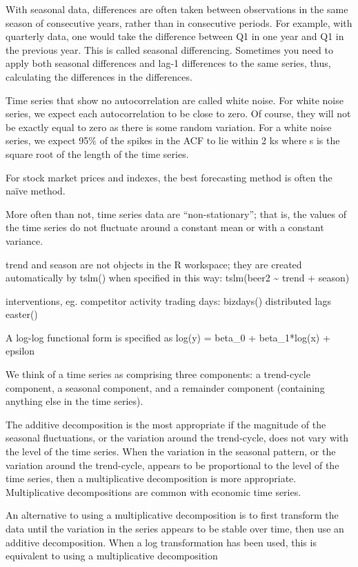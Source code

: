 \documentclass[]{book}
\begin{document}
With seasonal data, differences are often taken between observations in
the same season of consecutive years, rather than in consecutive
periods. For example, with quarterly data, one would take the difference
between Q1 in one year and Q1 in the previous year. This is called
seasonal differencing. Sometimes you need to apply both seasonal
differences and lag-1 differences to the same series, thus, calculating
the differences in the differences.

Time series that show no autocorrelation are called white noise. For
white noise series, we expect each autocorrelation to be close to zero.
Of course, they will not be exactly equal to zero as there is some
random variation. For a white noise series, we expect 95\% of the spikes
in the ACF to lie within 2 ks where s is the square root of the length
of the time series.

For stock market prices and indexes, the best forecasting method is
often the naïve method.

More often than not, time series data are ``non-stationary''; that is,
the values of the time series do not fluctuate around a constant mean or
with a constant variance.

trend and season are not objects in the R workspace; they are created
automatically by tslm() when specified in this way: tslm(beer2
\textasciitilde{} trend + season)

interventions, eg. competitor activity \textbar{} trading days:
bizdays() \textbar{} distributed lags \textbar{} easter()

A log-log functional form is specified as log(y) = beta\_0 +
beta\_1*log(x) + epsilon

We think of a time series as comprising three components: a trend-cycle
component, a seasonal component, and a remainder component (containing
anything else in the time series).

The additive decomposition is the most appropriate if the magnitude of
the seasonal fluctuations, or the variation around the trend-cycle, does
not vary with the level of the time series. When the variation in the
seasonal pattern, or the variation around the trend-cycle, appears to be
proportional to the level of the time series, then a multiplicative
decomposition is more appropriate. Multiplicative decompositions are
common with economic time series.

An alternative to using a multiplicative decomposition is to first
transform the data until the variation in the series appears to be
stable over time, then use an additive decomposition. When a log
transformation has been used, this is equivalent to using a
multiplicative decomposition
\end{document}
